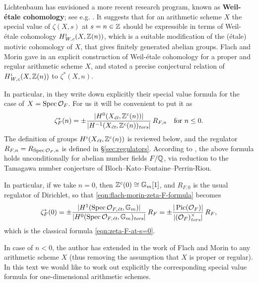 \documentclass{article}
\numberwithin{equation}{section}
\begin{document}
\vspace{1em}

Lichtenbaum has envisioned a more recent research program, known as
\textbf{Weil-étale cohomology}; see e.g.
\cite{Lichtenbaum-2005,Lichtenbaum-2009-number-rings,Lichtenbaum-2009-Euler-char}.
It suggests that for an arithmetic scheme $X$ the special value of $\zeta (X,s)$
at $s = n \in \ZZ$ should be expressible in terms of Weil-étale cohomology
$H^i_\Wc (X,\ZZ(n))$, which is a suitable modification of the (étale) motivic
cohomology of $X$, that gives finitely generated abelian groups. Flach and Morin
gave in \cite{Flach-Morin-2018} an explicit construction of Weil-étale
cohomology for a proper and regular arithmetic scheme $X$, and stated a precise
conjectural relation of $H^i_\Wc (X,\ZZ(n))$ to $\zeta^* (X,n)$.

In particular, in \cite[\S 5.8.3]{Flach-Morin-2018} they write down explicitly
their special value formula for the case of $X = \Spec \mathcal{O}_F$. For us it
will be convenient to put it as
\begin{equation}
  \label{eqn:flach-morin-zeta-F-formula}
  \zeta_F^* (n) = \pm\frac{|H^0 (X_\et, \ZZ^c (n))|}{|H^{-1} (X_\et, \ZZ^c (n))_\tors|}\,R_{F,n}
  \quad \text{for }n \le 0.
\end{equation}
The definition of groups $H^i (X_\et, \ZZ^c (n))$ is reviewed below, and the
regulator $R_{F,n} = R_{\Spec \mathcal{O}_F,n}$ is defined in
\S\ref{sec:regulators}. According to \cite[Proposition~5.35]{Flach-Morin-2018},
the above formula holds unconditionally for abelian number fields $F/\QQ$, via
reduction to the Tamagawa number conjecture of
Bloch--Kato--Fontaine--Perrin-Riou.

In particular, if we take $n = 0$, then $\ZZ^c (0) \cong \mathbb{G}_m [1]$, and
$R_{F,0}$ is the usual regulator of Dirichlet, so that
\eqref{eqn:flach-morin-zeta-F-formula} becomes
\[ \zeta_F^* (0) =
  \pm \frac{|H^1 (\Spec \mathcal{O}_{F,\et}, \mathbb{G}_m)|}{|H^0 (\Spec \mathcal{O}_{F,\et}, \mathbb{G}_m)_\tors|}\,R_F =
  \pm \frac{|\Pic (\mathcal{O}_F)|}{|(\mathcal{O}_F)^\times_\tors|}\,R_F, \]
which is the classical formula \eqref{eqn:zeta-F-at-s=0}.

In case of $n < 0$, the author has extended in
\cite{Beshenov-Weil-etale-1,Beshenov-Weil-etale-2} the work of Flach and Morin
to any arithmetic scheme $X$ (thus removing the assumption that $X$ is proper or
regular). In this text we would like to work out explicitly the corresponding
special value formula for one-dimensional arithmetic schemes.
\end{document}
